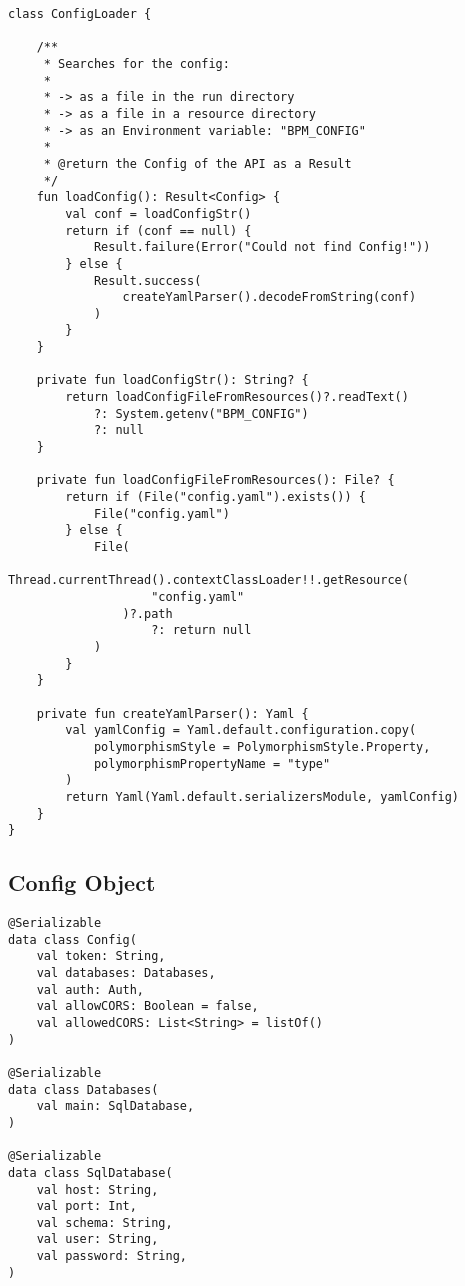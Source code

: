 \begin{verbatim}
class ConfigLoader {

    /**
     * Searches for the config:
     *
     * -> as a file in the run directory
     * -> as a file in a resource directory
     * -> as an Environment variable: "BPM_CONFIG"
     *
     * @return the Config of the API as a Result
     */
    fun loadConfig(): Result<Config> {
        val conf = loadConfigStr()
        return if (conf == null) {
            Result.failure(Error("Could not find Config!"))
        } else {
            Result.success(
                createYamlParser().decodeFromString(conf)
            )
        }
    }

    private fun loadConfigStr(): String? {
        return loadConfigFileFromResources()?.readText()
            ?: System.getenv("BPM_CONFIG")
            ?: null
    }

    private fun loadConfigFileFromResources(): File? {
        return if (File("config.yaml").exists()) {
            File("config.yaml")
        } else {
            File(
                Thread.currentThread().contextClassLoader!!.getResource(
                    "config.yaml"
                )?.path
                    ?: return null
            )
        }
    }

    private fun createYamlParser(): Yaml {
        val yamlConfig = Yaml.default.configuration.copy(
            polymorphismStyle = PolymorphismStyle.Property,
            polymorphismPropertyName = "type"
        )
        return Yaml(Yaml.default.serializersModule, yamlConfig)
    }
}

\end{verbatim}
\label{code:App_conf_loading}

\subsection{Config Object}

\begin{verbatim}
@Serializable
data class Config(
    val token: String,
    val databases: Databases,
    val auth: Auth,
    val allowCORS: Boolean = false,
    val allowedCORS: List<String> = listOf()
)

@Serializable
data class Databases(
    val main: SqlDatabase,
)

@Serializable
data class SqlDatabase(
    val host: String,
    val port: Int,
    val schema: String,
    val user: String,
    val password: String,
)
\end{verbatim}
\label{code:App_conf_data}


